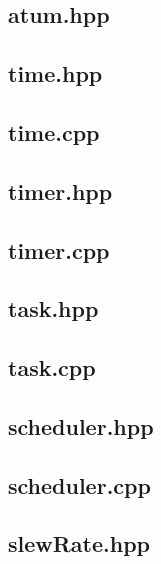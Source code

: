 \subsection{atum.hpp}

\subsection{time.hpp}

\subsection{time.cpp}

\subsection{timer.hpp}

\subsection{timer.cpp}

\subsection{task.hpp}

\subsection{task.cpp}

\subsection{scheduler.hpp}

\subsection{scheduler.cpp}

\subsection{slewRate.hpp}

